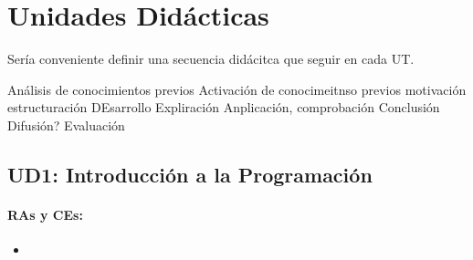 \section{Unidades Didácticas}


Sería conveniente definir una secuencia didácitca que seguir en cada UT.

Análisis de conocimientos previos
Activación de conocimeitnso previos
motivación
estructuración
DEsarrollo
Expliración
Anplicación, comprobación
Conclusión
Difusión?
Evaluación



%
%
%


\subsection{UD1: Introducción a la Programación}

	\paragraph{RAs y CEs:}
	\begin{itemize}[itemsep=0.1em, topsep=0.1em]
		\item\RAUNOa
	\end{itemize}


